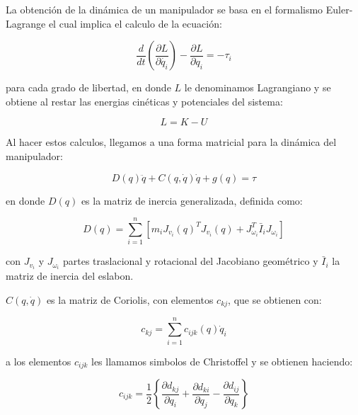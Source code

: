 \begin{multicols*}{3}
        La obtención de la dinámica de un manipulador se basa en el formalismo Euler-Lagrange el cual implica el calculo de la ecuación:

        \begin{equation}
            \frac{d}{dt} \left( \frac{\partial L}{\partial \dot{q_i}} \right) - \frac{\partial L}{\partial q_i} = - \tau_i
        \end{equation}

        para cada grado de libertad, en donde $L$ le denominamos Lagrangiano y se obtiene al restar las energias cinéticas y potenciales del sistema:

        \begin{equation}
            L = K - U
        \end{equation}

        Al hacer estos calculos, llegamos a una forma matricial para la dinámica del manipulador:

        \begin{equation}
            D(q) \ddot{q} + C(q, \dot{q}) \dot{q} + g(q) = \tau
        \end{equation}

        en donde $D(q)$ es la matriz de inercia generalizada, definida como:

        \begin{equation}
            D(q) = \sum_{i=1}^n \left[ m_i J_{v_i}(q)^T J_{v_i}(q) + J_{\omega_i}^T \bar{I}_i J_{\omega_i} \right]
        \end{equation}

        con $J_{v_i}$ y $J_{\omega_i}$ partes traslacional y rotacional del Jacobiano geométrico y $\bar{I}_i$ la matriz de inercia del eslabon.

        $C(q, \dot{q})$ es la matriz de Coriolis, con elementos $c_{kj}$, que se obtienen con:

        \begin{equation}
            c_{kj} = \sum_{i=1}^n c_{ijk}(q) \dot{q}_i
        \end{equation}

        a los elementos $c_{ijk}$ les llamamos simbolos de Christoffel y se obtienen haciendo:

        \begin{equation}
            c_{ijk} = \frac{1}{2} \left\{ \frac{\partial d_{kj}}{\partial q_i} + \frac{\partial d_{ki}}{\partial q_j} - \frac{\partial d_{ij}}{\partial q_k} \right\}
        \end{equation}


\end{multicols*}
